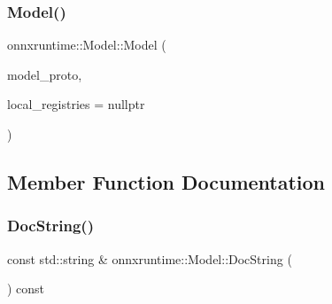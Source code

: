 \mbox{\label{classonnxruntime_1_1Model_ae64329b4d073efb3122d23b362c5b5f5}} 
\subsubsection{\texorpdfstring{Model()}{Model()}\hspace{0.1cm}{\footnotesize\ttfamily [3/3]}}
{\footnotesize\ttfamily onnxruntime\+::\+Model\+::\+Model (\begin{DoxyParamCaption}\item[{std\+::unique\+\_\+ptr$<$ O\+N\+N\+X\+\_\+\+N\+A\+M\+E\+S\+P\+A\+C\+E\+::\+Model\+Proto $>$}]{model\+\_\+proto,  }\item[{const \mbox{\hyperlink{namespaceonnxruntime_a37a91305e7190e83fa9c66117a6a4746}{I\+Onnx\+Runtime\+Op\+Schema\+Registry\+List}} $\ast$}]{local\+\_\+registries = {\ttfamily nullptr} }\end{DoxyParamCaption})\hspace{0.3cm}{\ttfamily [explicit]}}



\subsection{Member Function Documentation}
\mbox{\label{classonnxruntime_1_1Model_a3255fd55fde8752cc61e1d7da47b3ee2}} 
\subsubsection{\texorpdfstring{Doc\+String()}{DocString()}}
{\footnotesize\ttfamily const std\+::string \& onnxruntime\+::\+Model\+::\+Doc\+String (\begin{DoxyParamCaption}{ }\end{DoxyParamCaption}) const}

\mbox{\label{classonnxruntime_1_1Model_a17ae7242244056337ed571f19b54f51a}} 
